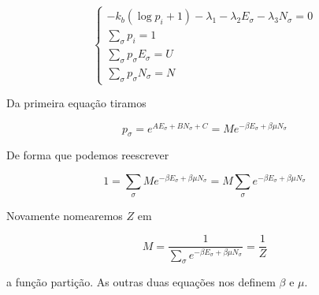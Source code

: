 \[
\begin{cases}
	-k_b (\log{p_i} + 1) - \lambda_1 - \lambda_2 E_\sigma  - \lambda_3 N_\sigma = 0\\
	\sum_{\sigma} p_i = 1 \\
	\sum_{\sigma} p_\sigma E_\sigma = U \\
	\sum_{\sigma} p_\sigma N_\sigma = N
\end{cases}
\]

Da primeira equação tiramos

\[
p_\sigma = e^{A E_\sigma + B N_\sigma + C} = M e^{-\beta E_\sigma +\beta \mu N_\sigma}
\]

De forma que podemos reescrever

\[
1 = \sum_\sigma M e^{-\beta E_\sigma +\beta \mu N_\sigma} = M \sum_\sigma e^{-\beta E_\sigma +\beta \mu N_\sigma}
\]

Novamente nomearemos $Z$ em 

\[
	M = \frac{1}{\sum_\sigma e^{-\beta E_\sigma +\beta \mu N_\sigma}} = \frac{1}{Z}
\]

a função partição. As outras duas equações nos definem $\beta$ e $\mu$.